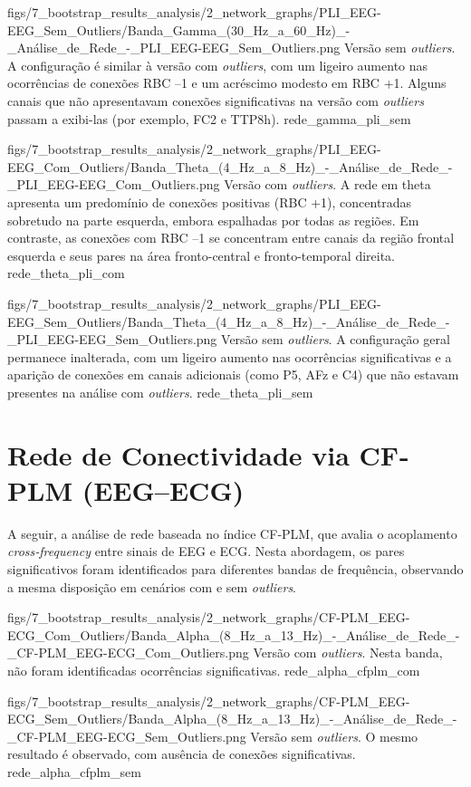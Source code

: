 \smallfigure
{figs/7_bootstrap_results_analysis/2_network_graphs/PLI_EEG-EEG_Sem_Outliers/Banda_Gamma_(30_Hz_a_60_Hz)_-_Análise_de_Rede_-_PLI_EEG-EEG_Sem_Outliers.png}
{Versão sem \textit{outliers}. A configuração é similar à versão com \textit{outliers}, com um ligeiro aumento nas ocorrências de conexões RBC –1 e um acréscimo modesto em RBC +1. Alguns canais que não apresentavam conexões significativas na versão com \textit{outliers} passam a exibi-las (por exemplo, FC2 e TTP8h).}
{rede_gamma_pli_sem}

\smallfigure
{figs/7_bootstrap_results_analysis/2_network_graphs/PLI_EEG-EEG_Com_Outliers/Banda_Theta_(4_Hz_a_8_Hz)_-_Análise_de_Rede_-_PLI_EEG-EEG_Com_Outliers.png}
{Versão com \textit{outliers}. A rede em theta apresenta um predomínio de conexões positivas (RBC +1), concentradas sobretudo na parte esquerda, embora espalhadas por todas as regiões. Em contraste, as conexões com RBC –1 se concentram entre canais da região frontal esquerda e seus pares na área fronto-central e fronto-temporal direita.}
{rede_theta_pli_com}

\smallfigure
{figs/7_bootstrap_results_analysis/2_network_graphs/PLI_EEG-EEG_Sem_Outliers/Banda_Theta_(4_Hz_a_8_Hz)_-_Análise_de_Rede_-_PLI_EEG-EEG_Sem_Outliers.png}
{Versão sem \textit{outliers}. A configuração geral permanece inalterada, com um ligeiro aumento nas ocorrências significativas e a aparição de conexões em canais adicionais (como P5, AFz e C4) que não estavam presentes na análise com \textit{outliers}.}
{rede_theta_pli_sem}


\section{Rede de Conectividade via CF‐PLM (EEG–ECG)}
A seguir, a análise de rede baseada no índice CF‐PLM, que avalia o acoplamento \emph{cross‐frequency} entre sinais de EEG e ECG. Nesta abordagem, os pares significativos foram identificados para diferentes bandas de frequência, observando a mesma disposição em cenários com e sem \textit{outliers}.

\smallfigure
{figs/7_bootstrap_results_analysis/2_network_graphs/CF-PLM_EEG-ECG_Com_Outliers/Banda_Alpha_(8_Hz_a_13_Hz)_-_Análise_de_Rede_-_CF-PLM_EEG-ECG_Com_Outliers.png}
{Versão com \textit{outliers}. Nesta banda, não foram identificadas ocorrências significativas.}
{rede_alpha_cfplm_com}

\smallfigure
{figs/7_bootstrap_results_analysis/2_network_graphs/CF-PLM_EEG-ECG_Sem_Outliers/Banda_Alpha_(8_Hz_a_13_Hz)_-_Análise_de_Rede_-_CF-PLM_EEG-ECG_Sem_Outliers.png}
{Versão sem \textit{outliers}. O mesmo resultado é observado, com ausência de conexões significativas.}
{rede_alpha_cfplm_sem}

